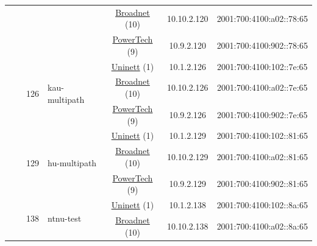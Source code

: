 \begin{small}
\begin{center}
\begin{longtable}{|c|c|c|c|c|c|c|c|}
  &  &  &  & \multicolumn{2}{|c|}{\tiny{\href{https://www.broadnet.no}{Broadnet} (10)}} & \tiny{10.10.2.120} & \tiny{2001:700:4100:a02::78:65} \\* \cline{5-5}\cline{6-6}\cline{7-7}\cline{8-8}
  &  &  &  & \multicolumn{2}{|c|}{\tiny{\href{http://www.powertech.no}{PowerTech} (9)}} & \tiny{10.9.2.120} & \tiny{2001:700:4100:902::78:65} \\* \cline{3-3}\cline{4-4}\cline{5-5}\cline{6-6}\cline{7-7}\cline{8-8}
  &  & \multirow{3}{*}{\tiny{126}} & \multicolumn{1}{|l|}{\multirow{3}{*}{\tiny{kau-multipath}}} & \multicolumn{2}{|c|}{\tiny{\href{https://www.uninett.no}{Uninett} (1)}} & \tiny{10.1.2.126} & \tiny{2001:700:4100:102::7e:65} \\* \cline{5-5}\cline{6-6}\cline{7-7}\cline{8-8}
  &  &  &  & \multicolumn{2}{|c|}{\tiny{\href{https://www.broadnet.no}{Broadnet} (10)}} & \tiny{10.10.2.126} & \tiny{2001:700:4100:a02::7e:65} \\* \cline{5-5}\cline{6-6}\cline{7-7}\cline{8-8}
  &  &  &  & \multicolumn{2}{|c|}{\tiny{\href{http://www.powertech.no}{PowerTech} (9)}} & \tiny{10.9.2.126} & \tiny{2001:700:4100:902::7e:65} \\* \cline{3-3}\cline{4-4}\cline{5-5}\cline{6-6}\cline{7-7}\cline{8-8}
  &  & \multirow{3}{*}{\tiny{129}} & \multicolumn{1}{|l|}{\multirow{3}{*}{\tiny{hu-multipath}}} & \multicolumn{2}{|c|}{\tiny{\href{https://www.uninett.no}{Uninett} (1)}} & \tiny{10.1.2.129} & \tiny{2001:700:4100:102::81:65} \\* \cline{5-5}\cline{6-6}\cline{7-7}\cline{8-8}
  &  &  &  & \multicolumn{2}{|c|}{\tiny{\href{https://www.broadnet.no}{Broadnet} (10)}} & \tiny{10.10.2.129} & \tiny{2001:700:4100:a02::81:65} \\* \cline{5-5}\cline{6-6}\cline{7-7}\cline{8-8}
  &  &  &  & \multicolumn{2}{|c|}{\tiny{\href{http://www.powertech.no}{PowerTech} (9)}} & \tiny{10.9.2.129} & \tiny{2001:700:4100:902::81:65} \\* \cline{3-3}\cline{4-4}\cline{5-5}\cline{6-6}\cline{7-7}\cline{8-8}
  &  & \multirow{3}{*}{\tiny{138}} & \multicolumn{1}{|l|}{\multirow{3}{*}{\tiny{ntnu-test}}} & \multicolumn{2}{|c|}{\tiny{\href{https://www.uninett.no}{Uninett} (1)}} & \tiny{10.1.2.138} & \tiny{2001:700:4100:102::8a:65} \\* \cline{5-5}\cline{6-6}\cline{7-7}\cline{8-8}
  &  &  &  & \multicolumn{2}{|c|}{\tiny{\href{https://www.broadnet.no}{Broadnet} (10)}} & \tiny{10.10.2.138} & \tiny{2001:700:4100:a02::8a:65} \\* \cline{5-5}\cline{6-6}\cline{7-7}\cline{8-8}

\end{longtable}
\end{center}
\end{small}
